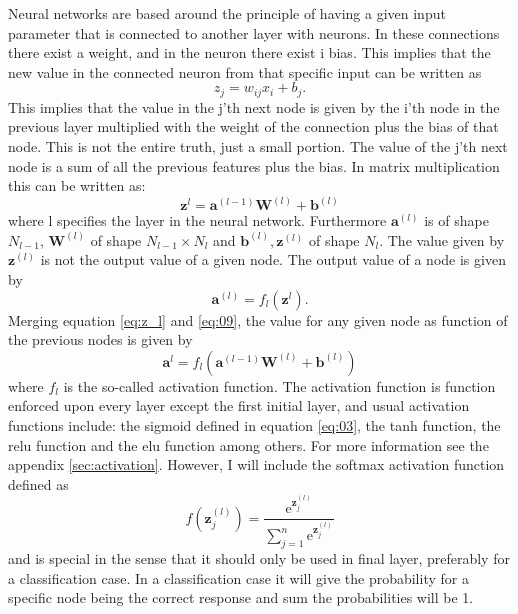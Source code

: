 \documentclass[uio,jmp,amsmath,amssymb,reprint,nofootinbib]{revtex4-1}
\numberwithin{equation}{section}
\newcommand{\e}{\mathrm{e}}
\newcommand{\lp}{\left(}
\newcommand{\rp}{\right)}
\begin{document}
Neural networks are based around the principle of having a given input parameter that is connected to another layer with neurons. In these connections there exist a weight, and in the neuron there exist i bias. This implies that the new value in the connected neuron from that specific input can be written as
\begin{equation}
z_j = w_{ij}x_i + b_j.
\end{equation}
This implies that the value in the j'th next node is given by the i'th node in the previous layer multiplied with the weight of the connection plus the bias of that node. This is not the entire truth, just a small portion. The value of the j'th next node is a sum of all the previous features plus the bias. In matrix multiplication this can be written as:
\begin{equation}\label{eq:z_l}
\bm{z}^{l} = \bm{a}^{(l-1)}\bm{W}^{(l)} + \bm{b}^{(l)}
\end{equation}
where l specifies the layer in the neural network. Furthermore \(\bm{a}^{(l)}\) is of shape \(N_{l-1}\), \(\bm{W}^{(l)}\) of shape \(N_{l-1}\times N_{l}\) and \(\bm{b}^{(l)}, \bm{z}^{(l)}\) of shape \(N_{l}\). The value given by \(\bm{z}^{(l)}\) is not the output value of a given node. The output value of a node is given by
\begin{equation}\label{eq:09}
\bm{a}^{(l)} = f_l\lp \bm{z}^{l}\rp.
\end{equation}
Merging equation \ref{eq:z_l} and \ref{eq:09}, the value for any given node as function of the previous nodes is given by
\begin{equation}\label{eq:new_eq}
\bm{a}^{l} = f_{l}\lp \bm{a}^{(l-1)}\bm{W}^{(l)} + \bm{b}^{(l)}\rp
\end{equation}
where \(f_l\) is the so-called activation function. The activation function is function enforced upon every layer except the first initial layer, and usual activation functions include: the sigmoid defined in equation \ref{eq:03}, the tanh function, the relu function and the elu function among others. For more information see the appendix \ref{sec:activation}. However, I will include the softmax activation function defined as
\begin{equation}\label{eq:10}
f(\bm{z}^{(l)}_j) = \frac{\e^{\bm{z}^{(l)}_j}}{\sum_{j=1}^n \e^{\bm{z}^{(l)}_j}} 
\end{equation}
and is special in the sense that it should only be used in final layer, preferably for a classification case. In a classification case it will give the probability for a specific node being the correct response and sum the probabilities will be 1. 
\end{document}
